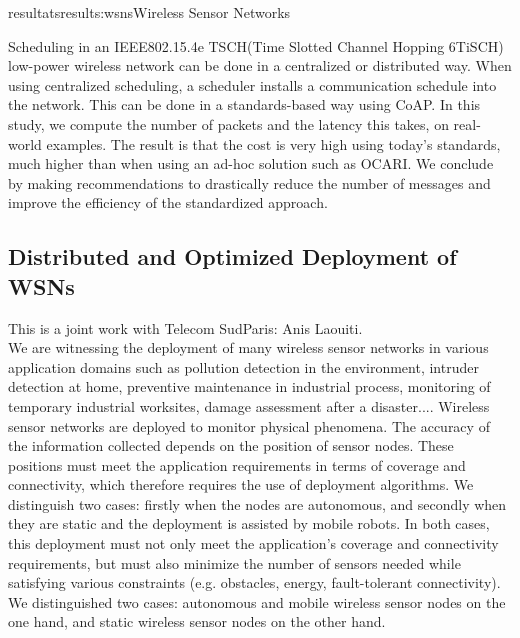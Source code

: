 \documentclass{ra2016}
\begin{document}
\begin{module}{resultats}{results:wsns}{Wireless Sensor Networks}
\begin{participants}
\end{participants}

Scheduling in an IEEE802.15.4e TSCH(Time Slotted Channel Hopping 6TiSCH) low-power wireless network can be done in a centralized or distributed way. When using centralized scheduling, a scheduler installs a communication schedule into the network. This can be done in a standards-based way using CoAP. In this study, we compute the number of packets  and the latency this takes, on real-world examples. The result is that the cost is very high using today's standards, much higher than when using an ad-hoc solution such as OCARI. We conclude by making recommendations to drastically reduce the number of messages and improve the efficiency of the standardized approach.

\subsection{Distributed and Optimized Deployment of WSNs}

\begin{participants}
\end{participants}

This is a joint work with Telecom SudParis: Anis Laouiti.\\

We are witnessing the deployment of many wireless sensor networks in various application domains such as pollution detection in the environment, intruder detection at home, preventive maintenance in industrial process, monitoring of temporary industrial worksites, damage assessment after a disaster.... Wireless sensor networks are deployed to monitor physical phenomena. The accuracy
of the information collected depends on the position of sensor nodes. These positions must
meet the application requirements in terms of coverage and connectivity, which therefore
requires the use of deployment algorithms. We distinguish two cases: firstly when the nodes
are autonomous, and secondly when they are static and the deployment is assisted by
mobile robots. In both cases, this deployment must not only meet the application's coverage
and connectivity requirements, but must also minimize the number of sensors needed
while satisfying various constraints (e.g. obstacles, energy, fault-tolerant connectivity).
We distinguished two cases: autonomous and mobile wireless sensor nodes on the one hand, and static wireless sensor nodes on the other hand.


\end{module}
\end{document}
